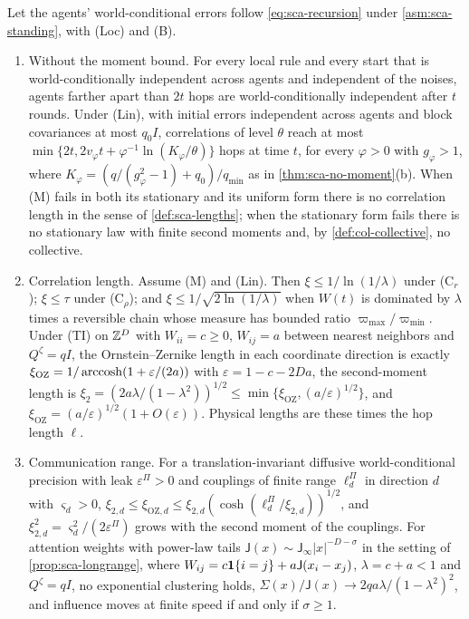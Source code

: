 \begin{theorem}\label{thm:sca-h4}
Let the agents' world-conditional errors follow \eqref{eq:sca-recursion} under \cref{asm:sca-standing}, with \textup{(Loc)} and \textup{(B)}.
\begin{enumerate}
\item[(a)] Without the moment bound. For every local rule and every start that is world-conditionally independent across agents and independent of the noises, agents farther apart than $2t$ hops are world-conditionally independent after $t$ rounds. Under \textup{(Lin)}, with initial errors independent across agents and block covariances at most $q_0I$, correlations of level $\theta$ reach at most $\min\{2t,2v_\varphi t+\varphi^{-1}\ln(K_\varphi/\theta)\}$ hops at time $t$, for every $\varphi>0$ with $g_\varphi>1$, where $K_\varphi=(q/(g_\varphi^2-1)+q_0)/q_{\min}$ as in \cref{thm:sca-no-moment}(b). When \textup{(M)} fails in both its stationary and its uniform form there is no correlation length in the sense of \cref{def:sca-lengths}; when the stationary form fails there is no stationary law with finite second moments and, by \cref{def:col-collective}, no collective.
\item[(b)] Correlation length. Assume \textup{(M)} and \textup{(Lin)}. Then $\xi\le1/\ln(1/\lambda)$ under \textup{(C$_r$)}; $\xi\le\tau$ under \textup{(C$_\rho$)}; and $\xi\le1/\sqrt{2\ln(1/\lambda)}$ when $W(t)$ is dominated by $\lambda$ times a reversible chain whose measure has bounded ratio $\varpi_{\max}/\varpi_{\min}$. Under \textup{(TI)} on $\mathbb{Z}^D$ with $W_{ii}=c\ge0$, $W_{ij}=a$ between nearest neighbors and $Q^\zeta=qI$, the Ornstein--Zernike length in each coordinate direction is exactly $\xi_{\mathrm{OZ}}=1/\operatorname{arccosh}(1+\varepsilon/(2a))$ with $\varepsilon=1-c-2Da$, the second-moment length is $\xi_2=(2a\lambda/(1-\lambda^2))^{1/2}\le\min\{\xi_{\mathrm{OZ}},(a/\varepsilon)^{1/2}\}$, and $\xi_{\mathrm{OZ}}=(a/\varepsilon)^{1/2}(1+O(\varepsilon))$. Physical lengths are these times the hop length $\ell$.
\item[(c)] Communication range. For a translation-invariant diffusive world-conditional precision with leak $\varepsilon^\Pi>0$ and couplings of finite range $\ell^\Pi_d$ in direction $d$ with $\varsigma_d>0$, $\xi_{2,d}\le\xi_{\mathrm{OZ},d}\le\xi_{2,d}(\cosh(\ell^\Pi_d/\xi_{2,d}))^{1/2}$, and $\xi_{2,d}^2=\varsigma_d^2/(2\varepsilon^\Pi)$ grows with the second moment of the couplings. For attention weights with power-law tails $\mathsf J(x)\sim\mathsf J_\infty|x|^{-D-\sigma}$ in the setting of \cref{prop:sca-longrange}, where $W_{ij}=c\mathbf{1}\{i=j\}+a\mathsf J(x_i-x_j)$, $\lambda=c+a<1$ and $Q^\zeta=qI$, no exponential clustering holds, $\Sigma(x)/\mathsf J(x)\to2qa\lambda/(1-\lambda^2)^2$, and influence moves at finite speed if and only if $\sigma\ge1$.

\end{enumerate}
\end{theorem}
